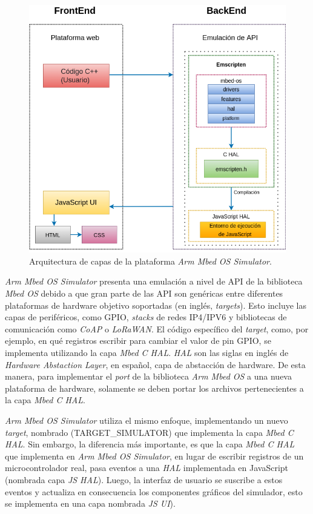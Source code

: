 \begin{figure}[ht]
	\centering
	\includegraphics[scale=.55]{./Figures/ArquitecturaMBED.png}
	\caption{Arquitectura de capas de la plataforma \textit{Arm Mbed OS Simulator}.}
	\label{fig:Arquitectura}
\end{figure}

\newpage

\textit{Arm Mbed OS Simulator} presenta una emulación a nivel de API de la biblioteca \textit{Mbed OS} debido a que gran parte de las API son genéricas entre diferentes plataformas de hardware objetivo soportadas (en inglés, \textit{targets}). Esto incluye las capas de periféricos, como GPIO, \textit{stacks} de redes IP4/IPV6 y bibliotecas de comunicación como \textit{CoAP} o \textit{LoRaWAN}. El código específico del \textit{target}, como, por ejemplo, en qué registros escribir para cambiar el valor de pin GPIO, se implementa utilizando la capa \textit{Mbed C HAL}. \textit{HAL} son las siglas en inglés de \textit{Hardware Abstaction Layer}, en español, capa de abstacción de hardware. De esta manera, para implementar el \textit{port} de la biblioteca \textit{Arm Mbed OS} a una nueva plataforma de hardware, solamente se deben portar los archivos pertenecientes a la capa \textit{Mbed C HAL}.

\textit{Arm Mbed OS Simulator} utiliza el mismo enfoque, implementando un nuevo \textit{target}, nombrado (TARGET\_SIMULATOR) que implementa la capa \textit{Mbed C HAL}. Sin embargo, la diferencia más importante, es que la capa \textit{Mbed C HAL} que implementa en \textit{Arm Mbed OS Simulator}, en lugar de escribir registros de un microcontrolador real, pasa eventos a una \textit{HAL} implementada en JavaScript (nombrada capa \textit{JS HAL}). Luego, la interfaz de usuario se suscribe a estos eventos y actualiza en consecuencia los componentes gráficos del simulador, esto se implementa en una capa nombrada \textit{JS UI}).

